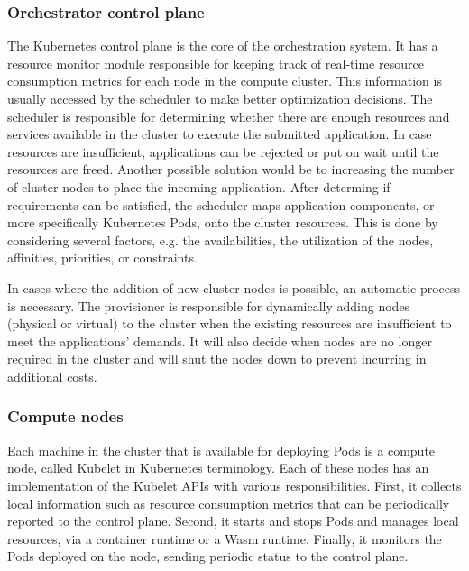 \documentclass{ieeeaccess}
\begin{document}
\subsubsection{Orchestrator control plane}

The Kubernetes control plane is the core of the orchestration system. It has a resource monitor module responsible for keeping track of real-time resource consumption metrics for each node in the compute cluster. This information is usually accessed by the scheduler to make better optimization decisions. The scheduler is responsible for determining whether there are enough resources and services available in the cluster to execute the submitted application. In case resources are insufficient, applications can be rejected or put on wait until the resources are freed. Another possible solution would be to increasing the number of cluster nodes to place the incoming application. After determing if requirements can be satisfied, the scheduler maps application components, or more specifically Kubernetes Pods, onto the cluster resources. This is done by considering several factors, e.g. the availabilities, the utilization of the nodes, affinities, priorities, or constraints.

In cases where the addition of new cluster nodes is possible, an automatic process is necessary. The provisioner is responsible for dynamically adding nodes (physical or virtual) to the cluster when the existing resources are insufficient to meet the applications' demands. It will also decide when nodes are no longer required in the cluster and will shut the nodes down to prevent incurring in additional costs.

\subsubsection{Compute nodes}

Each machine in the cluster that is available for deploying Pods is a compute node, called Kubelet in Kubernetes terminology. Each of these nodes has an implementation of the Kubelet APIs with various responsibilities. First, it collects local information such as resource consumption metrics that can be periodically reported to the control plane. Second, it starts and stops Pods and manages local resources, via a container runtime or a Wasm runtime. Finally, it monitors the Pods deployed on the node, sending periodic status to the control plane.
\end{document}
